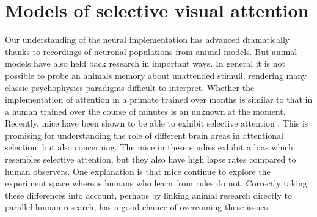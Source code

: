 \section{Models of selective visual attention}

Our understanding of the neural implementation has advanced dramatically thanks to recordings of neuronal populations from animal models. But animal models have also held back research in important ways. In general it is not possible to probe an animals memory about unattended stimuli, rendering many classic psychophysics paradigms difficult to interpret. Whether the implementation of attention in a primate trained over months is similar to that in a human trained over the course of minutes is an unknown at the moment. Recently, mice have been shown to be able to exhibit selective attention \citep{McBride2019-py,Wang2018-ge}. This is promising for understanding the role of different brain areas in attentional selection, but also concerning. The mice in these studies exhibit a bias which resembles selective attention, but they also have high lapse rates compared to human observers. One explanation is that mice continue to explore the experiment space \citep{Pisupati2019-cl} whereas humans who learn from rules do not. Correctly taking these differences into account, perhaps by linking animal research directly to parallel human research, has a good chance of overcoming these issues. 


